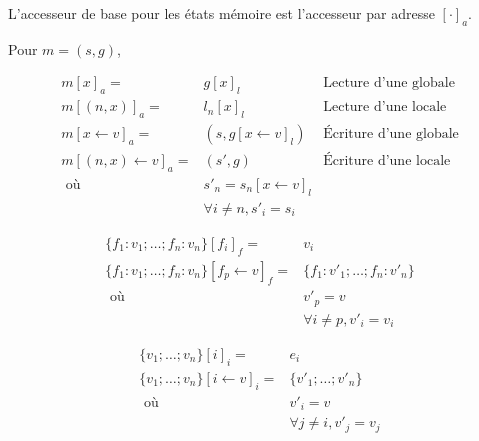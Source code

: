 \begin{definition}

  L'accesseur de base pour les états mémoire est l'accesseur par adresse
  $[\cdot]_a$.

  Pour $m = (s, g)$,

  \begin{align*}
    m [x]_a          = & g[x]_l        & \textrm{Lecture d'une globale} \\
    m [(n, x)]_a     = & l_n[x]_l      & \textrm{Lecture d'une locale} \\
    m [x ← v]_a      = & (s, g[x←v]_l) & \textrm{Écriture d'une globale} \\
    m [(n, x) ← v]_a = & (s', g)       & \textrm{Écriture d'une locale} \\
           \mbox{ où } & s'_n = s_n[x ← v]_l \\
                       & ∀ i ≠ n, s'_i = s_i
  \end{align*}

\end{definition}

\begin{definition}

  \begin{align*}
    \{ f_1 : v_1; … ; f_n : v_n \}[f_i]_f = & v_i \\
    \{ f_1 : v_1; … ; f_n : v_n \}[f_p ← v]_f = & \{ f_1 : v'_1; … ; f_n : v'_n \} \\
          \mbox{ où } & v'_p = v \\
                      & ∀ i ≠ p, v'_i = v_i
  \end{align*}

\end{definition}

\begin{definition}

  \begin{align*}
    \{ v_1 ; … ; v_n \} [i]_i   = & e_i \\
    \{ v_1 ; … ; v_n \} [i←v]_i = & \{ v'_1 ; … ; v'_n \} \\
                      \mbox{ où } & v'_i = v \\
                                  & ∀j≠i, v'_j = v_j
  \end{align*}

\end{definition}

